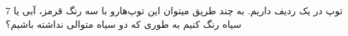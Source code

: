 7 توپ در یک ردیف داریم. به چند طریق میتوان این توپ‌هارو با سه رنگ قرمز، آبی یا سیاه رنگ کنیم به طوری که دو سیاه متوالی نداشته باشیم؟